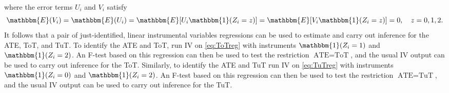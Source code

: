 \documentclass[oneside,11pt]{article}
\begin{document}
where the error terms $U_i$ and $V_i$ satisfy 
\[
\mathbbm{E}(V_i) = \mathbbm{E}(U_i) = \mathbbm{E}[U_i \mathbbm{1}(Z_i = z)] = \mathbbm{E}[V_i \mathbbm{1}(Z_i = z)] = 0, \quad z = 0, 1, 2.
\]
It follows that a pair of just-identified, linear instrumental variables regressions can be used to estimate and carry out inference for the ATE, ToT, and TuT. To identify the ATE and ToT, run IV on \eqref{eq:ToTreg} with instruments $\mathbbm{1}(Z_i = 1)$ and $\mathbbm{1}(Z_i=2)$. An F-test based on this regression can then be used to test the restriction $\text{ATE} = \text{ToT}$, and the usual IV output can be used to carry out inference for the ToT. Similarly, to identify the ATE and TuT run IV on \ref{eq:TuTreg} with instruments $\mathbbm{1}(Z_i = 0)$ and $\mathbbm{1}(Z_i = 2)$. An F-test based on this regression can then be used to test the restriction $\text{ATE} = \text{TuT}$, and the usual IV output can be used to carry out inference for the TuT. 
\end{document}
